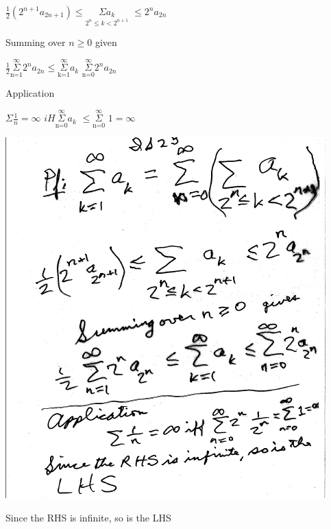 \documentclass[10pt,a4paper]{article}
\begin{document}
{{\begin{center}
$\frac{1}{2}(2^{n+1}a_{2n+1}) \leq {\underset{\text{$2^{n}\leq k < 2^{n+1}$}}{\Sigma a_{k}}}$ $\leq 2^{n}a_{2n}$

Summing over $n \geq 0$ given

$\frac{1}{2}\underset{\text{n=1}}{\overset{\text{$\infty$}}{\Sigma}} 2^{n}a_{2n} \leq \underset{\text{k=1}}{\overset{\text{$\infty$}}{\Sigma}} a_{k}$ $\underset{\text{n=0}}{\overset{\text{$\infty$}}{\Sigma}}2^{n}a_{2n}$

\end{center}

Application

\begin{center}

$\Sigma \frac{1}{n} = \infty$ $iH \underset{\text{n=0}}{\overset{\text{$\infty$}}{\Sigma}}a_{k}$ $\leq \underset{\text{n=0}}{\overset{\text{$\infty$}}{\Sigma}}$ $1=\infty$

\includegraphics[scale=.7]{Pages/IS_23}

\end{center}

Since the RHS is infinite, so is the LHS


\normalsize

\newpage

}}
\end{document}
